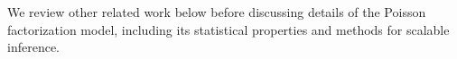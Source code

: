 


We review other related work below before discussing details of the
Poisson factorization model, including its statistical properties and
methods for scalable inference.








